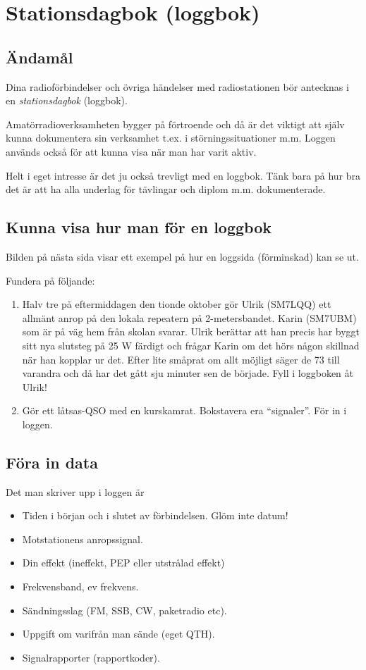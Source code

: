 \section{Stationsdagbok (loggbok)}

\subsection{Ändamål}

Dina radioförbindelser och övriga händelser med radiostationen bör
antecknas i en \emph{stationsdagbok} (loggbok).

Amatörradioverksamheten bygger på förtroende och då är det viktigt att
själv kunna dokumentera sin verksamhet t.ex. i störningssituationer
m.m. Loggen används också för att kunna visa när man har varit aktiv.

Helt i eget intresse är det ju också trevligt med en loggbok. Tänk
bara på hur bra det är att ha alla underlag för tävlingar och diplom
m.m. dokumenterade.

\subsection{Kunna visa hur man för en loggbok}

Bilden på nästa sida visar ett exempel på hur en loggsida (förminskad)
kan se ut.

Fundera på följande:
\begin{enumerate}
\item Halv tre på eftermiddagen den tionde oktober gör Ulrik (SM7LQQ)
  ett allmänt anrop på den lokala repeatern på 2-metersbandet.  Karin
  (SM7UBM) som är på väg hem från skolan svarar. Ulrik berättar att
  han precis har byggt sitt nya slutsteg på 25 W färdigt och frågar
  Karin om det hörs någon skillnad när han kopplar ur det. Efter lite
  småprat om allt möjligt säger de 73 till varandra och då har det
  gått sju minuter sen de började.  Fyll i loggboken åt Ulrik!
\item Gör ett låtsas-QSO med en kurskamrat. Bokstavera era
  ``signaler''. För in i loggen.
\end{enumerate}

\subsection{Föra in data}
Det man skriver upp i loggen är
\begin{itemize}
\item Tiden i början och i slutet av förbindelsen. Glöm inte datum!
\item Motstationens anropssignal.
\item Din effekt (ineffekt, PEP eller utstrålad effekt)
\item Frekvensband, ev frekvens.
\item Sändningsslag (FM, SSB, CW, paketradio etc).
\item Uppgift om varifrån man sände (eget QTH).
\item Signalrapporter (rapportkoder).
\end{itemize}

